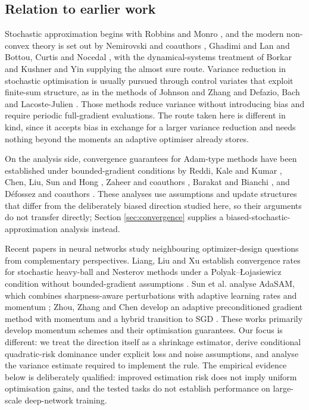 \documentclass[pdflatex,sn-mathphys-num]{sn-jnl}%
\theoremstyle{thmstyleone}%
\theoremstyle{thmstyletwo}%
\theoremstyle{thmstylethree}%
\begin{document}
\subsection{Relation to earlier work}

Stochastic approximation begins with Robbins and Monro \cite{robbins1951}, and the modern non-convex theory is set out by Nemirovski and coauthors \cite{nemirovski2009}, Ghadimi and Lan \cite{ghadimi2013} and Bottou, Curtis and Nocedal \cite{bottou2018}, with the dynamical-systems treatment of Borkar \cite{borkar2008} and Kushner and Yin \cite{kushner2003} supplying the almost sure route. Variance reduction in stochastic optimisation is usually pursued through control variates that exploit finite-sum structure, as in the methods of Johnson and Zhang \cite{johnson2013} and Defazio, Bach and Lacoste-Julien \cite{defazio2014}. Those methods reduce variance without introducing bias and require periodic full-gradient evaluations. The route taken here is different in kind, since it accepts bias in exchange for a larger variance reduction and needs nothing beyond the moments an adaptive optimiser already stores.

On the analysis side, convergence guarantees for Adam-type methods have been established under bounded-gradient conditions by Reddi, Kale and Kumar \cite{reddi2018}, Chen, Liu, Sun and Hong \cite{chen2019}, Zaheer and coauthors \cite{zaheer2018}, Barakat and Bianchi \cite{barakat2021}, and D\'efossez and coauthors \cite{defossez2022}. These analyses use assumptions and update structures that differ from the deliberately biased direction studied here, so their arguments do not transfer directly; Section \ref{sec:convergence} supplies a biased-stochastic-approximation analysis instead.

Recent papers in neural networks study neighbouring optimizer-design questions from complementary perspectives. Liang, Liu and Xu establish convergence rates for stochastic heavy-ball and Nesterov methods under a Polyak--Łojasiewicz condition without bounded-gradient assumptions \cite{liang2023momentum}. Sun et al. analyse AdaSAM, which combines sharpness-aware perturbations with adaptive learning rates and momentum \cite{sun2024adasam}; Zhou, Zhang and Chen develop an adaptive preconditioned gradient method with momentum and a hybrid transition to SGD \cite{zhou2026adapgradm}. These works primarily develop momentum schemes and their optimisation guarantees. Our focus is different: we treat the direction itself as a shrinkage estimator, derive conditional quadratic-risk dominance under explicit loss and noise assumptions, and analyse the variance estimate required to implement the rule. The empirical evidence below is deliberately qualified: improved estimation risk does not imply uniform optimisation gains, and the tested tasks do not establish performance on large-scale deep-network training.
\end{document}
